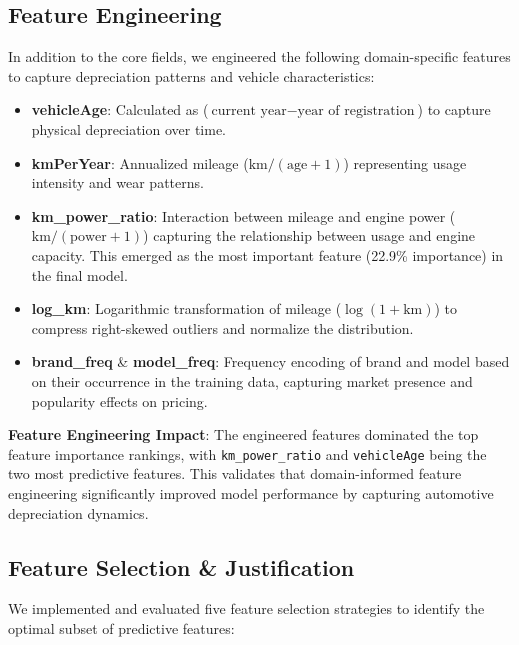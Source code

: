 \documentclass[12pt, a4paper]{article}
\begin{document}
\subsection{Feature Engineering}
In addition to the core fields, we engineered the following domain-specific features to capture depreciation patterns and vehicle characteristics:

\begin{itemize}
  \item \textbf{vehicleAge}: Calculated as ($\text{current year} - \text{year of registration}$) to capture physical depreciation over time.
  \item \textbf{kmPerYear}: Annualized mileage ($\text{km} / (\text{age} + 1)$) representing usage intensity and wear patterns.
  \item \textbf{km\_power\_ratio}: Interaction between mileage and engine power ($\text{km} / (\text{power} + 1)$) capturing the relationship between usage and engine capacity. This emerged as the most important feature (22.9\% importance) in the final model.
  \item \textbf{log\_km}: Logarithmic transformation of mileage ($\log(1 + \text{km})$) to compress right-skewed outliers and normalize the distribution.
  \item \textbf{brand\_freq} \& \textbf{model\_freq}: Frequency encoding of brand and model based on their occurrence in the training data, capturing market presence and popularity effects on pricing.
\end{itemize}

\textbf{Feature Engineering Impact}: The engineered features dominated the top feature importance rankings, with \texttt{km\_power\_ratio} and \texttt{vehicleAge} being the two most predictive features. This validates that domain-informed feature engineering significantly improved model performance by capturing automotive depreciation dynamics.

\subsection{Feature Selection \& Justification}
We implemented and evaluated five feature selection strategies to identify the optimal subset of predictive features:
\end{document}
